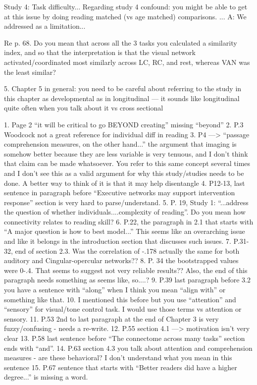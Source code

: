 Study 4: Task difficulty... Regarding study 4 confound: you might be able to get at this issue by doing reading matched (vs age matched) comparisons. ...
A: We addressed as a limitation...

Re p. 68. Do you mean that across all the 3 tasks you calculated a similarity index, and so that the interpretation is that the visual network activated/coordinated most similarly across LC, RC, and rest, whereas VAN was the least similar? 



5. Chapter 5 in general: you need to be careful about referring to the study in this chapter as developmental as in longitudinal — it sounds like longitudinal quite often when you talk about it vs cross sectional 






1. Page 2 “it will be critical to go BEYOND creating” missing “beyond”
2. P.3 Woodcock not a great reference for individual diff in reading 
3. P4 —> “passage comprehension measures, on the other hand...”  the argument that imaging is somehow better because they are less variable is very tenuous, and I don’t think that claim can be made whatsoever. You refer to this same concept several times and I don’t see this as a valid argument for why this study/studies needs to be done. A better way to think of it is that it may help disentangle 4. 
P12-13, last sentence in paragraph before “Executive networks may support intervention response” section is very hard to parse/understand.
5. P. 19, Study 1: “...address the question of whether individuals....complexity of reading”. Do you mean how connectivity relates to reading skill?
6. P.22, the paragraph in 2.1 that starts with “A major question is how to best model...”  This seems like an overarching issue and like it belongs in the introduction section that discusses such issues.
7. P.31-32, end of section 2.3.  Was the correlation of -.178 actually the same for both auditory and Cingular-opercular networks??
8. P. 34 the bootstrapped values were 0-.4. That seems to suggest not very reliable results?? Also, the end of this paragraph needs something as seems like, so....? 
9. P.39 last paragraph before 3.2 you have a sentence with “along” when I think you mean “align with” or something like that.
10. I mentioned this before but you use “attention” and “sensory” for visual/tone control task. I would use those terms vs attention or sensory.
11. P.53 2nd to last paragraph at the end of Chapter 3 is very fuzzy/confusing - needs a re-write.
12. P.55 section 4.1 —> motivation isn’t very clear 13. P.58 last sentence before “The connectome across many tasks” section ends with “and”.
14. P.63 section 4.3 you talk about attention and comprehension measures - are these behavioral? I don’t understand what you mean in this sentence 15. P.67 sentence that starts with “Better readers did have a higher degree...” is missing a word.


